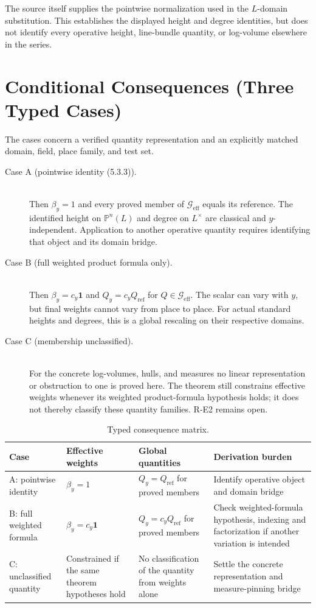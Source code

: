 \documentclass[11pt,a4paper]{article}
\theoremstyle{definition}
\theoremstyle{remark}
\newcommand{\Geff}{\mathcal{G}_{\mathrm{eff}}}
\begin{document}
The source itself supplies the pointwise normalization used in the
$L$-domain substitution. This establishes the displayed height and degree
identities, but does not identify every operative height, line-bundle
quantity, or log-volume elsewhere in the series.

\section{Conditional Consequences (Three Typed Cases)}\label{sec:consequences}

The cases concern a verified quantity representation and an explicitly
matched domain, field, place family, and test set.
\begin{description}
\item[Case A (pointwise identity (5.3.3)).]\mbox{}\\
Then $\beta_y=1$ and every proved member of $\Geff$ equals its reference.
The identified height on $\mathbb P^n(L)$ and degree on $L^\times$
are classical and $y$-independent. Application to another operative
quantity requires identifying that object and its domain bridge.
\item[Case B (full weighted product formula only).]\mbox{}\\
Then $\beta_y=c_y\mathbf1$ and $Q_y=c_yQ_{\mathrm{ref}}$ for
$Q\in\Geff$. The scalar can vary with $y$, but final weights cannot vary
from place to place. For actual standard heights and degrees, this is
a global rescaling on their respective domains.
\item[Case C (membership unclassified).]\mbox{}\\
For the concrete log-volumes, hulls, and measures no linear
representation or obstruction to one is proved here.
The theorem still constrains effective weights whenever its weighted
product-formula hypothesis holds; it does not thereby classify these
quantity families. R-E2 remains open.
\end{description}

\begin{table}[htbp]
\centering\small
\caption{Typed consequence matrix.}\label{tab:case_verdicts}
\begin{tabularx}{\textwidth}{@{}p{}XXX@{}}
\toprule
Case & Effective weights & Global quantities & Derivation burden\\
\midrule
A: pointwise identity & $\beta_y=1$ & $Q_y=Q_{\mathrm{ref}}$ for proved members & Identify operative object and domain bridge\\
\addlinespace
B: full weighted formula & $\beta_y=c_y\mathbf1$ & $Q_y=c_yQ_{\mathrm{ref}}$ for proved members & Check weighted-formula hypothesis, indexing and factorization if another variation is intended\\
\addlinespace
C: unclassified quantity & Constrained if the same theorem hypotheses hold & No classification of the quantity from weights alone & Settle the concrete representation and measure-pinning bridge\\
\bottomrule
\end{tabularx}
\end{table}
\end{document}
